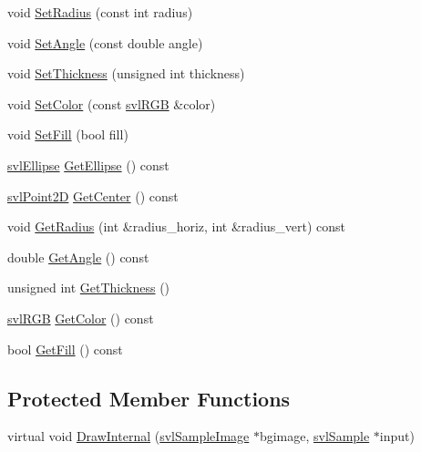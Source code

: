 \begin{DoxyCompactItemize}
\item 
void \hyperlink{classsvl_overlay_static_ellipse_a378a0fe17fab27a3e27b86437320bb18}{Set\+Radius} (const int radius)
\item 
void \hyperlink{classsvl_overlay_static_ellipse_a244f954cee64fb95083c2deca5ff98c8}{Set\+Angle} (const double angle)
\item 
void \hyperlink{classsvl_overlay_static_ellipse_a19d204f52ba31be5a99d8515f6d6721d}{Set\+Thickness} (unsigned int thickness)
\item 
void \hyperlink{classsvl_overlay_static_ellipse_ad7f462bef9e31a544baadb1dc8fe3766}{Set\+Color} (const \hyperlink{structsvl_r_g_b}{svl\+R\+G\+B} \&color)
\item 
void \hyperlink{classsvl_overlay_static_ellipse_a7f4d8f9af622a71285f9929ea097ebe3}{Set\+Fill} (bool fill)
\item 
\hyperlink{structsvl_ellipse}{svl\+Ellipse} \hyperlink{classsvl_overlay_static_ellipse_a2719df986a1af52cb7d8b1514d8db4c3}{Get\+Ellipse} () const 
\item 
\hyperlink{structsvl_point2_d}{svl\+Point2\+D} \hyperlink{classsvl_overlay_static_ellipse_a6d901d9551dc43c6658982d4c363cfda}{Get\+Center} () const 
\item 
void \hyperlink{classsvl_overlay_static_ellipse_a5df9071c8ed2a486eff8cb84f3928d4a}{Get\+Radius} (int \&radius\+\_\+horiz, int \&radius\+\_\+vert) const 
\item 
double \hyperlink{classsvl_overlay_static_ellipse_af859fde9c441ebbb11b6f2899f267d1f}{Get\+Angle} () const 
\item 
unsigned int \hyperlink{classsvl_overlay_static_ellipse_ac45ad83fb27320a377ad47ba91201653}{Get\+Thickness} ()
\item 
\hyperlink{structsvl_r_g_b}{svl\+R\+G\+B} \hyperlink{classsvl_overlay_static_ellipse_ab2f93640fd421110a023e96d4443c295}{Get\+Color} () const 
\item 
bool \hyperlink{classsvl_overlay_static_ellipse_ad9b60a15912d16ddd793bda9cb81b7e1}{Get\+Fill} () const 
\end{DoxyCompactItemize}
\subsection*{Protected Member Functions}
\begin{DoxyCompactItemize}
\item 
virtual void \hyperlink{classsvl_overlay_static_ellipse_aaa04be283fc452b67eef406c57e57361}{Draw\+Internal} (\hyperlink{classsvl_sample_image}{svl\+Sample\+Image} $\ast$bgimage, \hyperlink{classsvl_sample}{svl\+Sample} $\ast$input)
\end{DoxyCompactItemize}
